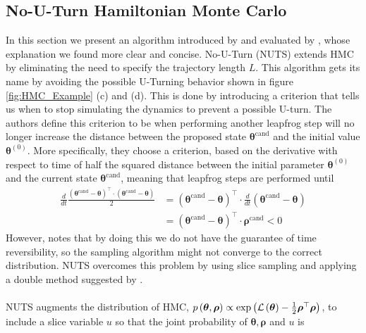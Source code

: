 \clearpage
\subsection{No-U-Turn Hamiltonian Monte Carlo}\label{sec:nuts}
In this section we present an algorithm introduced by \cite{hoffman2011nouturn} and evaluated by \cite{nishio_arakawa_nouturn}, whose explanation we found more clear and concise. No-U-Turn (NUTS) extends HMC by eliminating the need to specify the trajectory length $L$. This algorithm gets its name by avoiding the possible U-Turning behavior shown in figure \ref{fig:HMC_Example} (c) and (d). This is done by introducing a criterion that tells us when to stop simulating the dynamics to prevent a possible U-turn. The authors define this criterion to be when performing another leapfrog step will no longer increase the distance between the proposed state $\boldsymbol{\theta}^{\text{cand}}$ and the initial value $\boldsymbol{\theta}^{(0)}$. More specifically, they choose a criterion, based on the derivative with respect to time of half the squared distance between the initial parameter $\boldsymbol{\theta}^{(0)}$ and the current state $\boldsymbol{\theta}^{\text{cand}}$, meaning that leapfrog steps are performed until 
\begin{equation*}
\begin{split}
    \frac{d}{d t} \frac{(\boldsymbol{\theta}^{\text{cand}}-\boldsymbol{\theta})^\top \cdot(\boldsymbol{\theta}^{\text{cand}}-\boldsymbol{\theta})}{2}&=(\boldsymbol{\theta}^{\text{cand}}-\boldsymbol{\theta})^\top \cdot \frac{d}{d t}(\boldsymbol{\theta}^{\text{cand}}-\boldsymbol{\theta})\\
    &=(\boldsymbol{\theta}^{\text{cand}}-\boldsymbol{\theta})^\top \cdot \boldsymbol{\rho}^{\text{cand}} < 0
\end{split}
\end{equation*}
However, \cite{hoffman2011nouturn} notes that by doing this we do not have the guarantee of time reversibility, so the sampling algorithm might not converge to the correct distribution. NUTS overcomes this problem by using slice sampling and applying a double method suggested by \cite{neal_slice_sampling}. 
\\
\\
NUTS augments the distribution of HMC, $p \left (\boldsymbol{\theta}, \boldsymbol{\rho}\right) \propto \exp{\left(\mathcal{L} \left (\boldsymbol{\theta}\right) - \frac{1}{2} \boldsymbol{\rho}^\top \boldsymbol{\rho}\right)}$, to include a slice variable $u$ so that the joint probability of $\boldsymbol{\theta}, \boldsymbol{\rho}$ and $u$ is 
